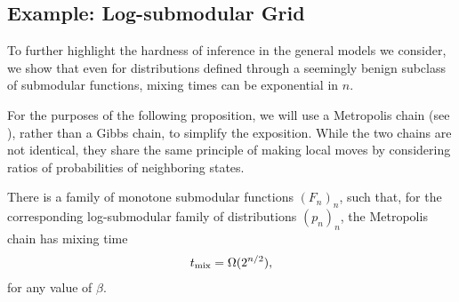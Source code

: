 \subsection{Example: Log-submodular Grid}
To further highlight the hardness of inference in the general models we consider, we show that even for distributions defined through a seemingly benign subclass of submodular functions, mixing times can be exponential in $n$.

For the purposes of the following proposition, we will use a Metropolis chain (see ), rather than a Gibbs chain, to simplify the exposition.
While the two chains are not identical, they share the same principle of making local moves by considering ratios of probabilities of neighboring states.
\begin{prop}
There is a family of monotone submodular functions $(F_n)_n$, such that, for the corresponding log-submodular family of distributions $(p_n)_n$, the Metropolis chain has mixing time
\begin{align*}
  t_{\mathrm{mix}}  = \Omega(2^{n/2}),
\end{align*}
for any value of $\beta$.
\end{prop}

